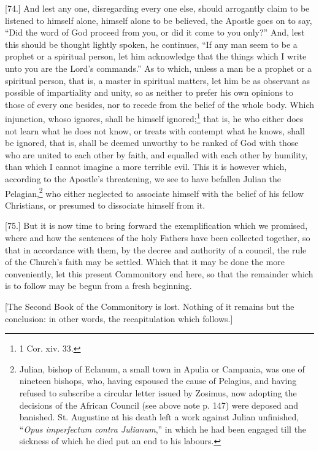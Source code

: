 [74.] And lest any one, disregarding every one else, should arrogantly claim to be listened to himself alone, himself alone to be believed, the Apostle goes on to say, “Did the word of God proceed from you, or did it come to you only?” And, lest this should be thought lightly spoken, he continues, “If any man seem to be a prophet or a spiritual person, let him acknowledge that the things which I write unto you are the Lord’s commands.” As to which, unless a man be a prophet or a spiritual person, that is, a master in spiritual matters, let him be as observant as possible of impartiality and unity, so as neither to prefer his own opinions to those of every one besides, nor to recede from the belief of the whole body. Which injunction, whoso ignores, shall be himself ignored;\footnote{1 Cor. xiv. 33.} that is, he who either does not learn what he does not know, or treats with contempt what he knows, shall be ignored, that is, shall be deemed unworthy to be ranked of God with those who are united to each other by faith, and equalled with each other by humility, than which I cannot imagine a more terrible evil. This it is however which, according to the Apostle’s threatening, we see to have befallen Julian the Pelagian,\footnote{Julian, bishop of Eclanum, a small town in Apulia or Campania, was one of nineteen bishops, who, having espoused the cause of Pelagius, and having refused to subscribe a circular letter issued by Zosimus, now adopting the decisions of the African Council (see above note p. 147) were deposed and banished. St. Augustine at his death left a work against Julian unfinished, “\emph{Opus imperfectum contra Julianum},” in which he had been engaged till the sickness of which he died put an end to his labours.} who either neglected to associate himself with the belief of his fellow Christians, or presumed to dissociate himself from it.

[75.] But it is now time to bring forward the exemplification which we promised, where and how the sentences of the holy Fathers have been collected together, so that in accordance with them, by the decree and authority of a council, the rule of the Church’s faith may be settled. Which that it may be done the more conveniently, let this present Commonitory end here, so that the remainder which is to follow may be begun from a fresh beginning.

[The Second Book of the Commonitory is lost. Nothing of it remains but the conclusion: in other words, the recapitulation which follows.]


